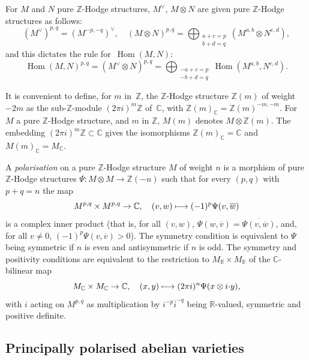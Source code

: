 \documentclass[JEP,XML,SOM,Unicode,NoFloatCountersInSection]{cedram}
\def\mto{\mathchoice{\longmapsto}{\mapsto}{\mapsto}{\mapsto}}
\let\oldvee\vee
\renewcommand{\vee}{{\scriptscriptstyle\oldvee}}
\theoremstyle{plain}
\theoremstyle{definition}
\numberwithin{equation}{subsection}
\let\ol\overline
\renewcommand{\C}{\mathbb C}
\newcommand{\R}{\mathbb R}
\newcommand{\Z}{\mathbb Z}
\DeclareMathOperator{\Hom}{Hom}
\begin{document}
For $M$ and $N$ pure $\Z$-Hodge structures, $M^\vee$, $M\otimes N$ are
given pure $\Z$-Hodge structures as follows:
\[
(M^\vee)^{p,q} = (M^{-p,-q})^\vee,\quad
(M\otimes N)^{p,q} = \bigoplus_{\substack{a+c=p\\ b+d=q}}
(M^{a,b}\otimes N^{c,d}),
\]
and this dictates the rule for~$\Hom(M,N)$:
\[
\Hom(M,N)^{p,q} = (M^\vee\otimes N)^{p,q}
=\bigoplus_{\substack{-a+c=p\\ -b+d=q}}
\Hom(M^{a,b},N^{c,d}).
\]

It is convenient to define, for $m$ in~$\Z$, the $\Z$-Hodge structure
$\Z(m)$ of weight $-2m$ as the sub-$\Z$-module $(2\pi i)^m\Z$ of~$\C$,
with $\Z(m)_\C=\Z(m)^{-m,-m}$. For $M$ a pure $\Z$-Hodge structure,
and $m$ in $\Z$, $M(m)$ denotes $M\otimes\Z(m)$. The embedding $(2\pi
i)^m\Z\subset\C$ gives the isomorphisms $\Z(m)_\C=\C$ and
$M(m)_\C=M_\C$.

A \emph{polarisation} on a pure $\Z$-Hodge structure $M$ of weight $n$
is a morphism of pure $\Z$-Hodge structures $\Psi\colon M\otimes
M\to\Z(-n)$ such that for every $(p,q)$ with $p+q=n$ the map
\[
M^{p,q}\times M^{p,q}\to \C,\quad (v,w)\mto (-1)^p\Psi(v,\ol{w})
\]
is a complex inner product (that is, for all $(v,w)$,
$\Psi(w,\ol{v})=\ol{\Psi(v,\ol{w})}$, and, for all $v\neq0$,
$(-1)^p\Psi(v,\ol{v})>0$). The symmetry condition is equivalent to
$\Psi$ being symmetric if $n$ is even and
antisymmetric if $n$ is odd. The symmetry and positivity conditions are
equivalent to the restriction to $M_\R\times M_\R$ of the
$\C$-bilinear map
\[
M_\C\times M_\C\to\C,\quad (x,y)\mto (2\pi i)^n\Psi(x\otimes i{\cdot}y),
\]
with $i$ acting on $M^{p,q}$ as multiplication by $i^{-p}\ol{i}^{-q}$
being $\R$-valued, symmetric and positive definite.

\subsection{Principally polarised abelian varieties}
\label{sec:ppavs}
\end{document}
